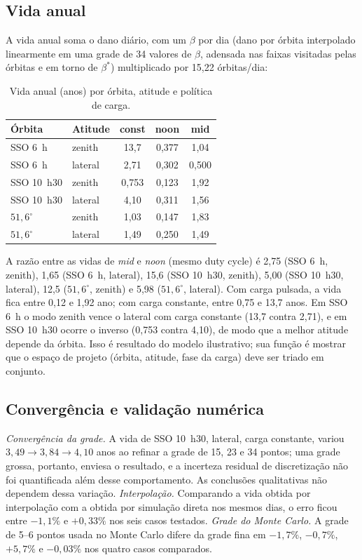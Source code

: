 \documentclass[12pt,a4paper]{article}
\begin{document}
\subsection{Vida anual}\label{sec:anual}
A vida anual soma o dano diário, com um $\beta$ por dia (dano por órbita
interpolado linearmente em uma grade de 34 valores de $\beta$, adensada nas
faixas visitadas pelas órbitas e em torno de $\beta^*$) multiplicado por
15,22 órbitas/dia:
\begin{table}[h]\centering\small
\caption{Vida anual (anos) por órbita, atitude e política de carga.}
\label{tab:anual}
\begin{tabular}{@{}llccc@{}}\toprule
Órbita & Atitude & const & noon & mid\\\midrule
SSO 6~h & zenith & 13,7 & 0,377 & 1,04\\
SSO 6~h & lateral & 2,71 & 0,302 & 0,500\\
SSO 10~h30 & zenith & 0,753 & 0,123 & 1,92\\
SSO 10~h30 & lateral & 4,10 & 0,311 & 1,56\\
$51{,}6^\circ$ & zenith & 1,03 & 0,147 & 1,83\\
$51{,}6^\circ$ & lateral & 1,49 & 0,250 & 1,49\\
\bottomrule\end{tabular}\end{table}
A razão entre as vidas de \emph{mid} e \emph{noon} (mesmo duty cycle) é 2,75
(SSO 6~h, zenith), 1,65 (SSO 6~h, lateral), 15,6 (SSO 10~h30, zenith), 5,00
(SSO 10~h30, lateral), 12,5 ($51{,}6^\circ$, zenith) e 5,98 ($51{,}6^\circ$,
lateral). Com carga pulsada, a vida fica entre 0,12 e 1,92 ano; com carga
constante, entre 0,75 e 13,7 anos. Em SSO 6~h o modo zenith vence o lateral
com carga constante (13,7 contra 2,71), e em SSO 10~h30 ocorre o inverso (0,753
contra 4,10), de modo que a melhor atitude depende da órbita. Isso é resultado
do modelo ilustrativo; sua função é mostrar que o espaço de projeto (órbita,
atitude, fase da carga) deve ser triado em conjunto.

\subsection{Convergência e validação numérica}
\emph{Convergência da grade.} A vida de SSO 10~h30, lateral, carga constante,
variou $3{,}49\to3{,}84\to4{,}10$ anos ao refinar a grade de 15, 23 e 34
pontos; uma grade grossa, portanto, enviesa o resultado, e a incerteza
residual de discretização não foi quantificada além desse comportamento. As
conclusões qualitativas não dependem dessa variação. \emph{Interpolação.}
Comparando a vida obtida por interpolação com a obtida por simulação direta
nos mesmos dias, o erro ficou entre $-1{,}1\%$ e $+0{,}33\%$ nos seis casos
testados. \emph{Grade do Monte Carlo.} A grade de 5--6 pontos usada no
Monte Carlo difere da grade fina em $-1{,}7\%$, $-0{,}7\%$, $+5{,}7\%$ e
$-0{,}03\%$ nos quatro casos comparados.
\end{document}
